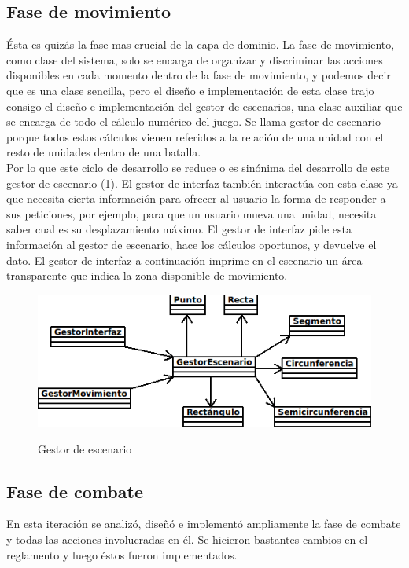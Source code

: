 \documentclass[a4paper,11pt]{article} %
\begin{document}
\subsection{Fase de movimiento}
\label{sec:mov}
\noindent
Ésta es quizás la fase mas crucial de la capa de dominio. La fase de
movimiento, como clase del sistema, solo se encarga de organizar y
discriminar las acciones disponibles en cada momento dentro de la fase
de movimiento, y podemos decir que es una clase sencilla, pero el
diseño e implementación de esta clase trajo consigo el diseño e
implementación del gestor de escenarios, una clase auxiliar que se
encarga de todo el cálculo numérico del juego. Se llama gestor de
escenario porque todos estos cálculos vienen referidos a la relación
de una unidad con el resto de unidades dentro de una batalla.\\

\noindent
Por lo que este ciclo de desarrollo se reduce o es sinónima del
desarrollo de este gestor de escenario (\ref{fig:escenario}). El
gestor de interfaz también interactúa con esta clase ya que necesita
cierta información para ofrecer al usuario la forma de responder a sus
peticiones, por ejemplo, para que un usuario mueva una unidad,
necesita saber cual es su desplazamiento máximo. El gestor de interfaz
pide esta información al gestor de escenario, hace los cálculos
oportunos, y devuelve el dato. El gestor de interfaz a continuación
imprime en el escenario un área transparente que indica la zona
disponible de movimiento.

\begin{figure}[h]
\centering
\includegraphics[scale=.8]{./imagenes/Escenario.png}
\label{fig:escenario}
\caption{Gestor de escenario}
\end{figure}

\subsection{Fase de combate}
\label{sec:com}
\noindent
En esta iteración se analizó, diseñó e implementó ampliamente la fase
de combate y todas las acciones involucradas en él. Se hicieron
bastantes cambios en el reglamento y luego éstos fueron
implementados.\\
\end{document}

